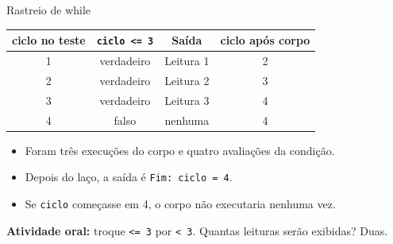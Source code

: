 \begin{frame}{Rastreio de while}
\begin{center}
\begin{tabular}{cccc}
\toprule
ciclo no teste & \texttt{ciclo <= 3} & Saída & ciclo após corpo \\
\midrule
1 & verdadeiro & Leitura 1 & 2 \\
2 & verdadeiro & Leitura 2 & 3 \\
3 & verdadeiro & Leitura 3 & 4 \\
4 & falso & nenhuma & 4 \\
\bottomrule
\end{tabular}
\end{center}
\begin{itemize}
\item Foram três execuções do corpo e quatro avaliações da condição.
\item Depois do laço, a saída é \texttt{Fim: ciclo = 4}.
\item Se \texttt{ciclo} começasse em 4, o corpo não executaria nenhuma vez.
\end{itemize}
\textbf{Atividade oral:} troque \texttt{<= 3} por \texttt{< 3}. Quantas leituras serão exibidas? Duas.
\end{frame}
